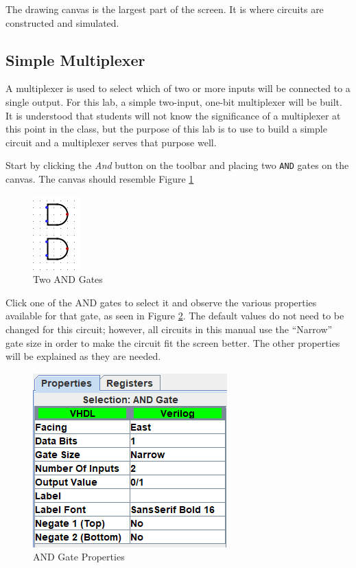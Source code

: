 The drawing canvas is the largest part of the screen. It is where circuits are constructed and simulated. 

\subsection{Simple Multiplexer}

A multiplexer is used to select which of two or more inputs will be connected to a single output. For this lab, a simple two-input, one-bit multiplexer will be built. It is understood that students will not know the significance of a multiplexer at this point in the class, but the purpose of this lab is to use \LE to build a simple circuit and a multiplexer serves that purpose well. 

Start by clicking the \textit{And} button on the toolbar and placing two \texttt{AND} gates on the canvas. The canvas should resemble Figure \ref{fig:01-02}

\begin{figure}[H]
	\centering
	\includegraphics[width=\maxwidth{.95\linewidth}]{gfx/01-02}
	\caption{Two AND Gates}
	\label{fig:01-02}
\end{figure}

Click one of the AND gates to select it and observe the various properties available for that gate, as seen in Figure \ref{fig:01-03}. The default values do not need to be changed for this circuit; however, all circuits in this manual use the ``Narrow'' gate size in order to make the circuit fit the screen better. The other properties will be explained as they are needed.

\begin{figure}[H]
	\centering
	\includegraphics[width=\maxwidth{.95\linewidth}]{gfx/01-03}
	\caption{AND Gate Properties}
	\label{fig:01-03}
\end{figure}

